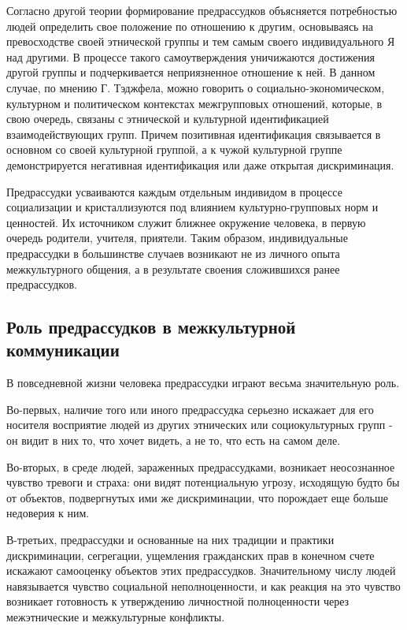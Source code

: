 \documentclass[14pt, a4paper] {ncc}
\begin{document}
Согласно другой теории формирование предрассудков объясняется потребностью
людей определить свое положение по отношению к другим, основываясь на
превосходстве своей этнической группы и тем самым своего индивидуального Я
над другими. В процессе такого самоутверждения уничижаются достижения другой
группы и подчеркивается неприязненное отношение к ней. В данном случае, по
мнению Г. Тэджфела, можно говорить о социально-экономическом, культурном и
политическом контекстах межгрупповых отношений, которые, в свою очередь, связаны
с этнической и культурной идентификацией взаимодействующих групп. Причем
позитивная идентификация связывается в основном со своей культурной группой,
а к чужой культурной группе демонстрируется негативная идентификация или
даже открытая дискриминация.

Предрассудки усваиваются каждым отдельным индивидом в процессе социализации
и кристаллизуются под влиянием культурно-групповых норм и ценностей. Их
источником служит ближнее окружение человека, в первую очередь родители,
учителя, приятели. Таким образом, индивидуальные предрассудки в большинстве
случаев возникают не из личного опыта межкультурного общения, а в результате
своения сложившихся ранее предрассудков.\cite{Sadoh}

	\subsection{Роль предрассудков в межкультурной коммуникации}

 В повседневной жизни человека предрассудки играют весьма значительную роль.

Во-первых, наличие того или иного предрассудка серьезно искажает для его
носителя восприятие людей из других этнических или социокультурных групп -
он видит в них то, что хочет видеть, а не то, что есть на самом деле.

Во-вторых, в среде людей, зараженных предрассудками, возникает неосознанное
чувство тревоги и страха: они видят потенциальную угрозу, исходящую будто
бы от объектов, подвергнутых ими же дискриминации, что порождает еще больше
недоверия к ним.

В-третьих, предрассудки и основанные на них традиции и практики дискриминации,
сегрегации, ущемления гражданских прав в конечном счете искажают самооценку
объектов этих предрассудков. Значительному числу людей навязывается чувство
социальной неполноценности, и как реакция на это чувство возникает готовность
к утверждению личностной полноценности через межэтнические и межкультурные
конфликты.
\end{document}
